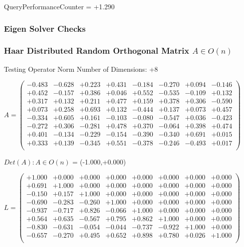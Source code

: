 \documentclass[9pt]{article}
\theoremstyle{plain}
\theoremstyle{definition}
\theoremstyle{remark}
\numberwithin{equation}{section}
\begin{document}
QueryPerformanceCounter  =  +1.290
\subsubsection{Eigen Solver Checks}
\subsubsection{Haar Distributed Random Orthogonal Matrix $A \in O(n)$}
 Testing Operator Norm
Number of Dimensions: +8

$A = \left(
\begin{array}{
cccccccc}
-0.483 & -0.628 & +0.223 & +0.431 & -0.184 & -0.270 & +0.094 & -0.146 \\
+0.452 & -0.157 & +0.386 & +0.046 & +0.552 & -0.535 & -0.109 & +0.132 \\
+0.317 & +0.132 & +0.211 & +0.477 & +0.159 & +0.378 & +0.306 & -0.590 \\
+0.073 & +0.258 & +0.693 & +0.132 & -0.444 & +0.137 & +0.073 & +0.457 \\
-0.334 & +0.605 & +0.161 & -0.103 & -0.080 & -0.547 & +0.036 & -0.423 \\
-0.272 & +0.306 & -0.281 & +0.478 & +0.370 & -0.064 & +0.398 & +0.474 \\
+0.401 & -0.134 & -0.229 & -0.154 & -0.390 & -0.340 & +0.691 & +0.015 \\
+0.333 & +0.139 & -0.345 & +0.551 & -0.378 & -0.246 & -0.493 & +0.017 \\
\end{array}
\right)$ \newline 

$Det(A) :   A \in O(n)$ = (-1.000,+0.000)

$L = \left(
\begin{array}{
cccccccc}
+1.000 & +0.000 & +0.000 & +0.000 & +0.000 & +0.000 & +0.000 & +0.000 \\
+0.691 & +1.000 & +0.000 & +0.000 & +0.000 & +0.000 & +0.000 & +0.000 \\
-0.150 & +0.157 & +1.000 & +0.000 & +0.000 & +0.000 & +0.000 & +0.000 \\
-0.690 & -0.283 & -0.260 & +1.000 & +0.000 & +0.000 & +0.000 & +0.000 \\
-0.937 & -0.717 & +0.826 & -0.066 & +1.000 & +0.000 & +0.000 & +0.000 \\
+0.564 & +0.635 & -0.567 & +0.795 & +0.862 & +1.000 & +0.000 & +0.000 \\
-0.830 & -0.631 & -0.054 & -0.044 & -0.737 & -0.922 & +1.000 & +0.000 \\
-0.657 & -0.270 & +0.495 & +0.652 & +0.898 & +0.780 & +0.026 & +1.000 \\
\end{array}
\right)$ \newline 
\end{document}
